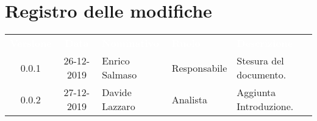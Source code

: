 \section*{Registro delle modifiche}
{
\renewcommand{\arraystretch}{1.5}
\centering
\begin{longtable}{ c c  C{4cm}  C{3cm} C{4cm}}
\textcolor{white}{\textbf{Versione}} & \textcolor{white}{\textbf{Data}} & \textcolor{white}{\textbf{Nominativo}} & \textcolor{white}{\textbf{Ruolo}} & \textcolor{white}{\textbf{Descrizione}}\\	


0.0.1 & 26-12-2019 & Enrico Salmaso & Responsabile & Stesura del documento.  \\	
0.0.2 & 27-12-2019 & Davide Lazzaro & Analista & Aggiunta Introduzione. \\
	
		
\end{longtable}
}